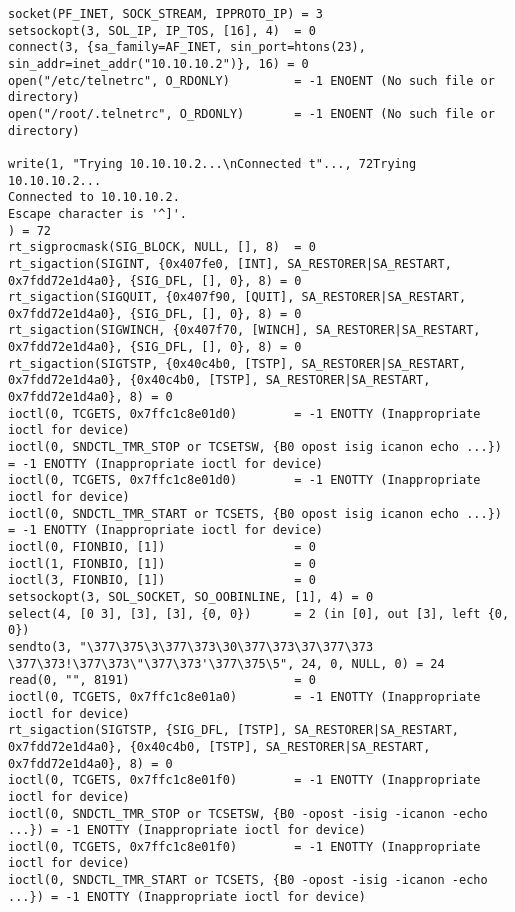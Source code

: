 \begin{lstlisting}[caption=Telnet失敗時,label=lst:telnet-fail,linebackgroundcolor={\ifnum\value{lstnumber}>24 \ifnum\value{lstnumber}<26\color{green!30}\fi\fi}]
socket(PF_INET, SOCK_STREAM, IPPROTO_IP) = 3
setsockopt(3, SOL_IP, IP_TOS, [16], 4)  = 0
connect(3, {sa_family=AF_INET, sin_port=htons(23), sin_addr=inet_addr("10.10.10.2")}, 16) = 0
open("/etc/telnetrc", O_RDONLY)         = -1 ENOENT (No such file or directory)
open("/root/.telnetrc", O_RDONLY)       = -1 ENOENT (No such file or directory)

write(1, "Trying 10.10.10.2...\nConnected t"..., 72Trying 10.10.10.2...
Connected to 10.10.10.2.
Escape character is '^]'.
) = 72
rt_sigprocmask(SIG_BLOCK, NULL, [], 8)  = 0
rt_sigaction(SIGINT, {0x407fe0, [INT], SA_RESTORER|SA_RESTART, 0x7fdd72e1d4a0}, {SIG_DFL, [], 0}, 8) = 0
rt_sigaction(SIGQUIT, {0x407f90, [QUIT], SA_RESTORER|SA_RESTART, 0x7fdd72e1d4a0}, {SIG_DFL, [], 0}, 8) = 0
rt_sigaction(SIGWINCH, {0x407f70, [WINCH], SA_RESTORER|SA_RESTART, 0x7fdd72e1d4a0}, {SIG_DFL, [], 0}, 8) = 0
rt_sigaction(SIGTSTP, {0x40c4b0, [TSTP], SA_RESTORER|SA_RESTART, 0x7fdd72e1d4a0}, {0x40c4b0, [TSTP], SA_RESTORER|SA_RESTART, 0x7fdd72e1d4a0}, 8) = 0
ioctl(0, TCGETS, 0x7ffc1c8e01d0)        = -1 ENOTTY (Inappropriate ioctl for device)
ioctl(0, SNDCTL_TMR_STOP or TCSETSW, {B0 opost isig icanon echo ...}) = -1 ENOTTY (Inappropriate ioctl for device)
ioctl(0, TCGETS, 0x7ffc1c8e01d0)        = -1 ENOTTY (Inappropriate ioctl for device)
ioctl(0, SNDCTL_TMR_START or TCSETS, {B0 opost isig icanon echo ...}) = -1 ENOTTY (Inappropriate ioctl for device)
ioctl(0, FIONBIO, [1])                  = 0
ioctl(1, FIONBIO, [1])                  = 0
ioctl(3, FIONBIO, [1])                  = 0
setsockopt(3, SOL_SOCKET, SO_OOBINLINE, [1], 4) = 0
select(4, [0 3], [3], [3], {0, 0})      = 2 (in [0], out [3], left {0, 0})
sendto(3, "\377\375\3\377\373\30\377\373\37\377\373 \377\373!\377\373\"\377\373'\377\375\5", 24, 0, NULL, 0) = 24
read(0, "", 8191)                       = 0
ioctl(0, TCGETS, 0x7ffc1c8e01a0)        = -1 ENOTTY (Inappropriate ioctl for device)
rt_sigaction(SIGTSTP, {SIG_DFL, [TSTP], SA_RESTORER|SA_RESTART, 0x7fdd72e1d4a0}, {0x40c4b0, [TSTP], SA_RESTORER|SA_RESTART, 0x7fdd72e1d4a0}, 8) = 0
ioctl(0, TCGETS, 0x7ffc1c8e01f0)        = -1 ENOTTY (Inappropriate ioctl for device)
ioctl(0, SNDCTL_TMR_STOP or TCSETSW, {B0 -opost -isig -icanon -echo ...}) = -1 ENOTTY (Inappropriate ioctl for device)
ioctl(0, TCGETS, 0x7ffc1c8e01f0)        = -1 ENOTTY (Inappropriate ioctl for device)
ioctl(0, SNDCTL_TMR_START or TCSETS, {B0 -opost -isig -icanon -echo ...}) = -1 ENOTTY (Inappropriate ioctl for device)

\end{lstlisting}
